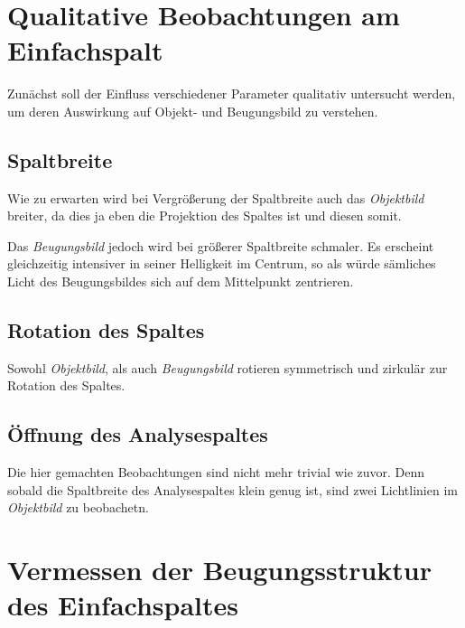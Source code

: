 \newpage

\section{Qualitative Beobachtungen am Einfachspalt}
\label{sec:A1}

Zunächst soll der Einfluss verschiedener Parameter qualitativ untersucht werden, um deren Auswirkung auf Objekt- und Beugungsbild zu verstehen.

\subsection*{Spaltbreite}
Wie zu erwarten wird bei Vergrößerung der Spaltbreite auch das \emph{Objektbild} breiter, da dies ja eben die Projektion des Spaltes ist und diesen somit.

Das \emph{Beugungsbild} jedoch wird bei größerer Spaltbreite schmaler. Es erscheint gleichzeitig intensiver in seiner Helligkeit im Centrum, so als würde sämliches Licht des Beugungsbildes sich auf dem Mittelpunkt zentrieren.

\subsection*{Rotation des Spaltes}
Sowohl \emph{Objektbild}, als auch \emph{Beugungsbild} rotieren symmetrisch und zirkulär zur Rotation des Spaltes. 

\subsection*{Öffnung des Analysespaltes}
Die hier gemachten Beobachtungen sind nicht mehr trivial wie zuvor. Denn sobald die Spaltbreite des Analysespaltes klein genug ist, sind zwei Lichtlinien im \emph{Objektbild} zu beobachetn. 

\section{Vermessen der Beugungsstruktur des Einfachspaltes}
\label{sec:A2}
